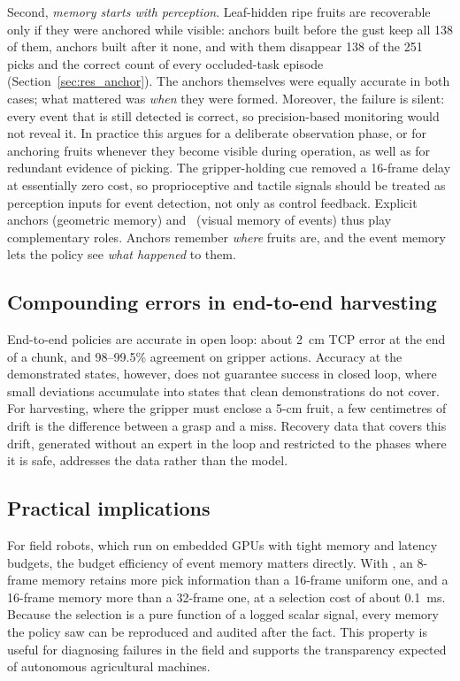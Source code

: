 Second, \emph{memory starts with perception}. Leaf-hidden ripe fruits are recoverable only if they were anchored while visible: anchors built before the gust keep all 138 of them, anchors built after it none, and with them disappear 138 of the 251 picks and the correct count of every occluded-task episode (Section~\ref{sec:res_anchor}). The anchors themselves were equally accurate in both cases; what mattered was \emph{when} they were formed. Moreover, the failure is silent: every event that is still detected is correct, so precision-based monitoring would not reveal it. In practice this argues for a deliberate observation phase, or for anchoring fruits whenever they become visible during operation, as well as for redundant evidence of picking. The gripper-holding cue removed a 16-frame delay at essentially zero cost, so proprioceptive and tactile signals should be treated as perception inputs for event detection, not only as control feedback. Explicit anchors (geometric memory) and \pekm\ (visual memory of events) thus play complementary roles. Anchors remember \emph{where} fruits are, and the event memory lets the policy see \emph{what happened} to them.

\subsection{Compounding errors in end-to-end harvesting}
End-to-end policies are accurate in open loop: about 2~cm TCP error at the end of a chunk, and 98--99.5\% agreement on gripper actions. Accuracy at the demonstrated states, however, does not guarantee success in closed loop, where small deviations accumulate into states that clean demonstrations do not cover. For harvesting, where the gripper must enclose a 5-cm fruit, a few centimetres of drift is the difference between a grasp and a miss. Recovery data that covers this drift, generated without an expert in the loop and restricted to the phases where it is safe, addresses the data rather than the model. 

\subsection{Practical implications}
For field robots, which run on embedded GPUs with tight memory and latency budgets, the budget efficiency of event memory matters directly. With \pekm, an 8-frame memory retains more pick information than a 16-frame uniform one, and a 16-frame memory more than a 32-frame one, at a selection cost of about 0.1~ms. Because the selection is a pure function of a logged scalar signal, every memory the policy saw can be reproduced and audited after the fact. This property is useful for diagnosing failures in the field and supports the transparency expected of autonomous agricultural machines.

